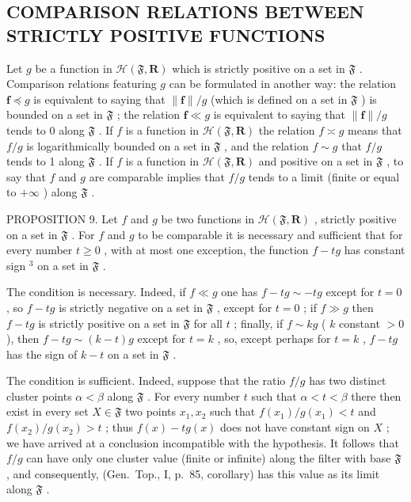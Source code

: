 \subsection{COMPARISON RELATIONS BETWEEN STRICTLY POSITIVE FUNCTIONS}

Let \(g\) be a function in \(\mathcal{H}(\mathfrak{F},\mathbf{R})\) which is strictly positive on a set in \(\mathfrak{F}\) . Comparison relations featuring \(g\) can be formulated in another way: the relation \(\mathbf{f} \preccurlyeq g\) is equivalent to saying that \(\| \mathbf{f}\| /g\) (which is defined on a set in \(\mathfrak{F}\) ) is bounded on a set in \(\mathfrak{F}\) ; the relation \(\mathbf{f} \ll g\) is equivalent to saying that \(\| \mathbf{f}\| /g\) tends to 0 along \(\mathfrak{F}\) . If \(f\) is a function in \(\mathcal{H}(\mathfrak{F},\mathbf{R})\) the relation \(f\asymp g\) means that \(f / g\) is logarithmically bounded on a set in \(\mathfrak{F}\) , and the relation \(f\sim g\) that \(f / g\) tends to 1 along \(\mathfrak{F}\) . If \(f\) is a function in \(\mathcal{H}(\mathfrak{F},\mathbf{R})\) and positive on a set in \(\mathfrak{F}\) , to say that \(f\) and \(g\) are comparable implies that \(f / g\) tends to a limit (finite or equal to \(+\infty\) ) along \(\mathfrak{F}\) .

PROPOSITION 9. Let \(f\) and \(g\) be two functions in \(\mathcal{H}(\mathfrak{F},\mathbf{R})\) , strictly positive on a set in \(\mathfrak{F}\) . For \(f\) and \(g\) to be comparable it is necessary and sufficient that for every number \(t \geqslant 0\) , with at most one exception, the function \(f - tg\) has constant sign \(^3\) on a set in \(\mathfrak{F}\) .

The condition is necessary. Indeed, if \(f \ll g\) one has \(f - tg \sim -tg\) except for \(t = 0\) , so \(f - tg\) is strictly negative on a set in \(\mathfrak{F}\) , except for \(t = 0\) ; if \(f \gg g\) then \(f - tg\) is strictly positive on a set in \(\mathfrak{F}\) for all \(t\) ; finally, if \(f \sim kg\) ( \(k\) constant \(> 0\) ), then \(f - tg \sim (k - t)g\) except for \(t = k\) , so, except perhaps for \(t = k\) , \(f - tg\) has the sign of \(k - t\) on a set in \(\mathfrak{F}\) .

The condition is sufficient. Indeed, suppose that the ratio \(f / g\) has two distinct cluster points \(\alpha < \beta\) along \(\mathfrak{F}\) . For every number \(t\) such that \(\alpha < t < \beta\) there then exist in every set \(X \in \mathfrak{F}\) two points \(x_{1}, x_{2}\) such that \(f(x_{1}) / g(x_{1}) < t\) and \(f(x_{2}) / g(x_{2}) > t\) ; thus \(f(x) - tg(x)\) does not have constant sign on \(X\) ; we have arrived at a conclusion incompatible with the hypothesis. It follows that \(f / g\) can have only one cluster value (finite or infinite) along the filter with base \(\mathfrak{F}\) , and consequently, (Gen.~Top., I, p.~85, corollary) has this value as its limit along \(\mathfrak{F}\) .

